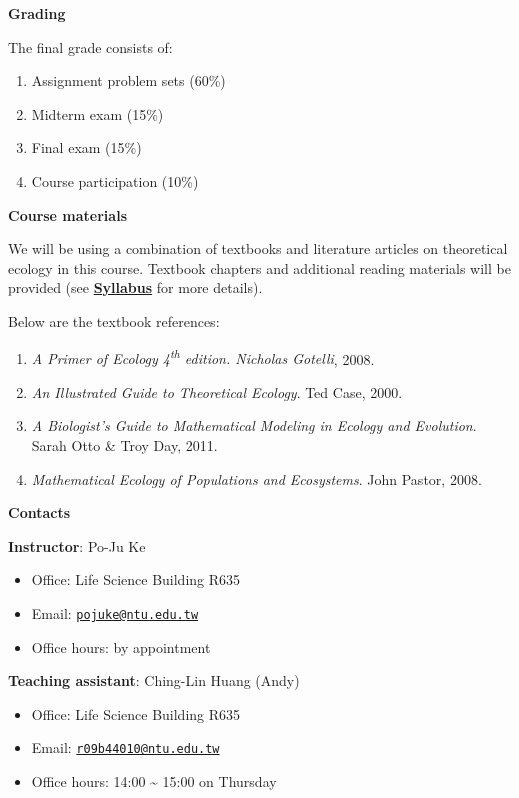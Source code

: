 \documentclass[
]{book}
\providecommand{\tightlist}{%
  \setlength{\itemsep}{0pt}\setlength{\parskip}{0pt}}
\begin{document}
\textbf{Grading}

The final grade consists of:

\begin{enumerate}
\def\labelenumi{(\arabic{enumi})}
\tightlist
\item
  Assignment problem sets (60\%)
\item
  Midterm exam (15\%)
\item
  Final exam (15\%)
\item
  Course participation (10\%)
\end{enumerate}

\textbf{Course materials}

We will be using a combination of textbooks and literature articles on theoretical ecology in this course. Textbook chapters and additional reading materials will be provided (see \href{https://chinglinhuang.github.io/2022_Fall_TheoEcol/syllabus.html}{\textbf{Syllabus}} for more details).

Below are the textbook references:

\begin{enumerate}
\def\labelenumi{(\arabic{enumi})}
\tightlist
\item
  \emph{A Primer of Ecology 4\textsuperscript{th} edition. Nicholas Gotelli}, 2008.
\item
  \emph{An Illustrated Guide to Theoretical Ecology}. Ted Case, 2000.
\item
  \emph{A Biologist's Guide to Mathematical Modeling in Ecology and Evolution}. Sarah Otto \& Troy Day, 2011.
\item
  \emph{Mathematical Ecology of Populations and Ecosystems}. John Pastor, 2008.
\end{enumerate}

\textbf{Contacts}

\textbf{Instructor}: Po-Ju Ke

\begin{itemize}
\tightlist
\item
  Office: Life Science Building R635
\item
  Email: \href{mailto:pojuke@ntu.edu.tw}{\nolinkurl{pojuke@ntu.edu.tw}}
\item
  Office hours: by appointment
\end{itemize}

\textbf{Teaching assistant}: Ching-Lin Huang (Andy)

\begin{itemize}
\tightlist
\item
  Office: Life Science Building R635
\item
  Email: \href{mailto:r09b44010@ntu.edu.tw}{\nolinkurl{r09b44010@ntu.edu.tw}}
\item
  Office hours: 14:00 \textasciitilde{} 15:00 on Thursday
\end{itemize}
\end{document}

